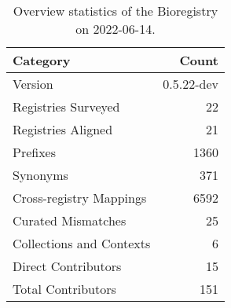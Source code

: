 \begin{table}
\centering
\caption{Overview statistics of the Bioregistry on 2022-06-14.}
\label{tab:bioregistry-summary}
\begin{tabular}{lr}
\toprule
                Category &      Count \\
\midrule
                 Version & 0.5.22-dev \\
     Registries Surveyed &         22 \\
      Registries Aligned &         21 \\
                Prefixes &       1360 \\
                Synonyms &        371 \\
 Cross-registry Mappings &       6592 \\
      Curated Mismatches &         25 \\
Collections and Contexts &          6 \\
     Direct Contributors &         15 \\
      Total Contributors &        151 \\
\bottomrule
\end{tabular}
\end{table}
